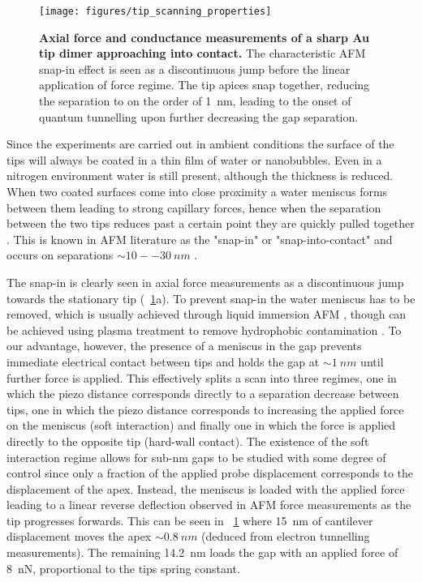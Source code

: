 \documentclass{book}
\begin{document}
\begin{figure}[h]
\centering
\texttt{[image: figures/tip\_scanning\_properties]}
\caption[Axial force and conductance measurements of a sharp Au tip dimer approaching into contact]{\textbf{Axial force and conductance measurements of a sharp Au tip dimer approaching into contact.} The characteristic AFM snap-in effect is seen as a discontinuous jump before the linear application of force regime. The tip apices snap together, reducing the separation to on the order of \SI{1}{nm}, leading to the onset of quantum tunnelling upon further decreasing the gap separation.}
\label{fig:tip_scan_props}
\end{figure}

Since the experiments are carried out in ambient conditions the surface of the tips will always be coated in a thin film of water or nanobubbles. Even in a nitrogen environment water is still present, although the thickness is reduced. When two coated surfaces come into close proximity a water meniscus forms between them leading to strong capillary forces, hence when the separation between the two tips reduces past a certain point they are quickly pulled together \cite{holmberg2013}. This is known in AFM literature as the "snap-in" or "snap-into-contact" and occurs on separations $\sim10--\SI{30}{nm}$ \cite{holmberg2003, song2014}.

The snap-in is clearly seen in axial force measurements as a discontinuous jump towards the stationary tip (\figurename~\ref{fig:tip_scan_props}a). To prevent snap-in the water meniscus has to be removed, which is usually achieved through liquid immersion AFM \cite{}, though can be achieved using plasma treatment to remove hydrophobic contamination \cite{song2014}. To our advantage, however, the presence of a meniscus in the gap prevents immediate electrical contact between tips and holds the gap at  $\sim\SI{1}{nm}$ until further force is applied. This effectively splits a scan into three regimes, one in which the piezo distance corresponds directly to a separation decrease between tips, one in which the piezo distance corresponds to increasing the applied force on the meniscus (soft interaction) and finally one in which the force is applied directly to the opposite tip (hard-wall contact). The existence of the soft interaction regime allows for sub-nm gaps to be studied with some degree of control since only a fraction of the applied probe displacement corresponds to the displacement of the apex. Instead, the meniscus is loaded with the applied force leading to a linear reverse deflection observed in AFM force measurements as the tip progresses forwards. This can be seen in \figurename~\ref{fig:tip_scan_props} where \SI{15}{nm} of cantilever displacement moves the apex $\sim\SI{0.8}{nm}$ (deduced from electron tunnelling measurements). The remaining \SI{14.2}{nm} loads the gap with an applied force of \SI{8}{nN}, proportional to the tips spring constant.
\end{document}

